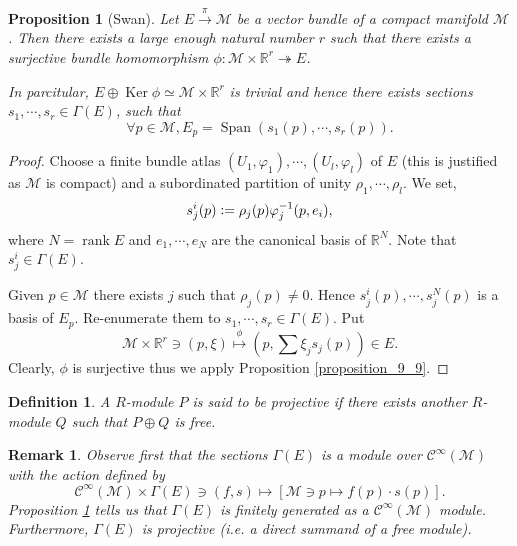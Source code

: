 \documentclass[8pt]{article}
\newtheorem{proposition}{Proposition}[section]
\newtheorem{definition}{Definition}[section]
\newtheorem{remark}{Remark}[section]
\DeclareMathOperator{\rank}{rank}
\DeclareMathOperator{\Ker}{Ker}
\DeclareMathOperator{\Span}{Span}
\newcommand{\defeq}{\vcentcolon=}
\newcommand{\R}[0]{\mathbb{R}}
\newcommand{\M}[0]{\mathcal{M}}
\newcommand{\cinf}[0]{\mathcal{C}^\infty}
\begin{document}
\begin{proposition}[Swan]
  \label{proposition_9_10}
  Let $E\stackrel{\pi}{\to}\M$ be a vector bundle of a compact manifold $\M$. Then there exists a large enough natural number $r$ such that there exists a surjective bundle homomorphism $\phi:\M\times\R^r\twoheadrightarrow E$.
  \par In parcitular, $E\oplus\Ker\phi\simeq \M\times \R^r$ is trivial and hence there exists sections $s_1,\cdots,s_r\in\Gamma(E)$, such that 
  \begin{equation*}
    \forall p\in\M, E_p = \Span(s_1(p),\cdots,s_r(p)).
  \end{equation*}
\end{proposition}
\begin{proof}
  Choose a finite bundle atlas $(U_1,\varphi_1),\cdots,(U_l,\varphi_l)$ of $E$ (this is justified as $\M$ is compact) and a subordinated partition of unity $\rho_1,\cdots,\rho_l$. 
  We set, 
  \begin{equation*}
    s_j^i(p)\defeq \rho_j(p)\varphi_j^{-1}(p,e_i),
  \end{equation*}
  where $N=\rank E$ and $e_1,\cdots,e_N$ are the canonical basis of $\R^N$. Note that $s_j^i\in\Gamma(E)$. 
  \par Given $p\in\M$ there exists $j$ such that $\rho_j(p)\not=0$. Hence $s_j^i(p),\cdots,s_j^N(p)$ is a basis of $E_p$.
  Re-enumerate them to $s_1,\cdots,s_r\in\Gamma(E)$. Put
  \begin{equation*}
    \M\times \R^r\ni (p,\xi)\stackrel{\phi}{\mapsto}\left(p,\sum\xi_js_j(p)\right)\in E.
  \end{equation*}
  Clearly, $\phi$ is surjective thus we apply Proposition \ref{proposition_9_9}.
\end{proof}

\begin{definition}
  A $R$-module $P$ is said to be projective if there exists another $R$-module $Q$ such that $P\oplus Q$ is free.
\end{definition}
\begin{remark}
  Observe first that the sections $\Gamma(E)$ is a module over $\cinf(\M)$ with the action defined by 
  \begin{equation*}
    \cinf(\M)\times \Gamma(E)\ni(f,s)\mapsto [\M\ni p\mapsto f(p)\cdot s(p)].
  \end{equation*}
  Proposition \ref{proposition_9_10} tells us that $\Gamma(E)$ is finitely generated as a $\cinf(\M)$ module. Furthermore, $\Gamma(E)$ is projective (i.e. a direct summand of a free module).
\end{remark}
\end{document}
